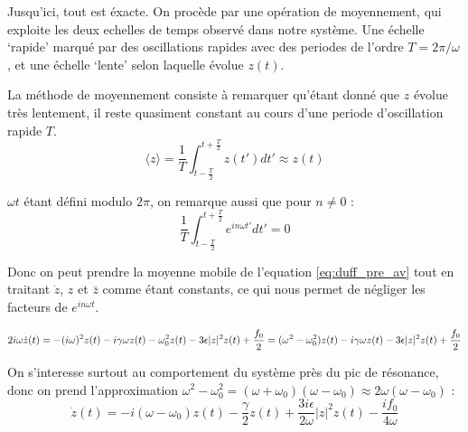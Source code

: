 Jusqu'ici, tout est éxacte. On procède par une opération de moyennement, qui exploite les deux echelles de temps observé dans notre système. 
Une échelle `rapide' marqué par des oscillations rapides avec des periodes de l'ordre $T = 2\pi / \omega$, 
et une échelle `lente' selon laquelle évolue $z(t)$. 

La méthode de moyennement consiste à remarquer qu'étant donné que $z$ évolue très lentement, il reste quasiment constant au cours d'une periode d'oscillation rapide $T$. 
\begin{equation*}
    \langle z \rangle = \frac{1}{T}\int_{t-\frac{T}{2}}^{t+\frac{T}{2}}{z(t')}dt' \approx  z(t)
\end{equation*}

$\omega t$ étant défini modulo $2\pi$, on remarque aussi que pour $n \neq 0$ :
\begin{equation*}
    \frac{1}{T}\int_{t-\frac{T}{2}}^{t+\frac{T}{2}}{e^{in\omega t'}}dt' = 0
\end{equation*}

Donc on peut prendre la moyenne mobile de l'equation \eqref{eq:duff_pre_av} 
tout en traitant $\dot{z}$, $z$ et $\bar{z}$ comme étant constants, 
ce qui nous permet de négliger les facteurs de $e^{i n\omega t}$.

\begin{dmath}
    2i\omega \dot{z}(t) = - (i\omega)^2 z(t)
    - i\gamma\omega z(t)
    - \omega_0^2 z(t) 
    - 3 \epsilon |z|^2 z(t)
    + \frac{f_0}{2} \\
    = (\omega^2 - \omega_0^2)z(t) - i\gamma\omega z(t) - 3\epsilon |z|^2 z(t) + \frac{f_0}{2}
    \label{eq:duff_pre_av}
\end{dmath}

On s'interesse surtout au comportement du système près du pic de résonance, 
donc on prend l'approximation $\omega^2 - \omega_0^2 = (\omega + \omega_0)(\omega - \omega_0) \approx 2\omega(\omega - \omega_0)$ :
\begin{dmath}
    \dot{z}(t) = -i(\omega - \omega_0)z(t)
    - \frac{\gamma}{2} z(t) + \frac{3i\epsilon}{2\omega}|z|^2z(t) - \frac{if_0}{4\omega}
\end{dmath}
